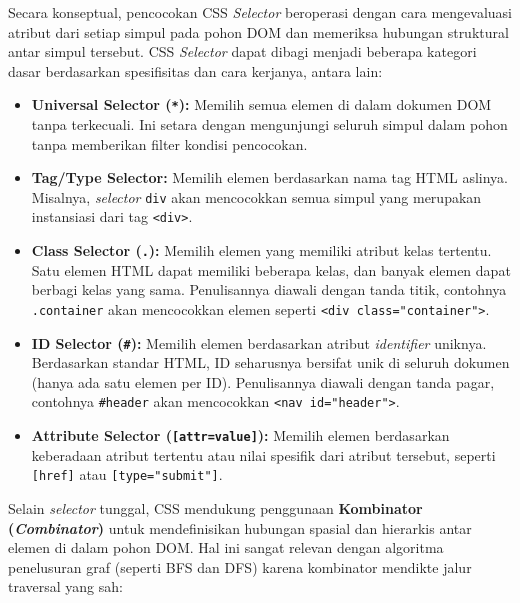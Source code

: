 \documentclass[12pt]{article}
\begin{document}
Secara konseptual, pencocokan CSS \textit{Selector} beroperasi dengan cara mengevaluasi atribut dari setiap simpul pada pohon DOM dan memeriksa hubungan struktural antar simpul tersebut. CSS \textit{Selector} dapat dibagi menjadi beberapa kategori dasar berdasarkan spesifisitas dan cara kerjanya, antara lain:

\begin{itemize}
    \item \textbf{Universal Selector (\verb|*|):} Memilih semua elemen di dalam dokumen DOM tanpa terkecuali. Ini setara dengan mengunjungi seluruh simpul dalam pohon tanpa memberikan filter kondisi pencocokan.
    
    \item \textbf{Tag/Type Selector:} Memilih elemen berdasarkan nama tag HTML aslinya. Misalnya, \textit{selector} \verb|div| akan mencocokkan semua simpul yang merupakan instansiasi dari tag \verb|<div>|.
    
    \item \textbf{Class Selector (\verb|.|):} Memilih elemen yang memiliki atribut kelas tertentu. Satu elemen HTML dapat memiliki beberapa kelas, dan banyak elemen dapat berbagi kelas yang sama. Penulisannya diawali dengan tanda titik, contohnya \verb|.container| akan mencocokkan elemen seperti \verb|<div class="container">|.
    
    \item \textbf{ID Selector (\verb|#|):} Memilih elemen berdasarkan atribut \textit{identifier} uniknya. Berdasarkan standar HTML, ID seharusnya bersifat unik di seluruh dokumen (hanya ada satu elemen per ID). Penulisannya diawali dengan tanda pagar, contohnya \verb|#header| akan mencocokkan \verb|<nav id="header">|.
    
    \item \textbf{Attribute Selector (\verb|[attr=value]|):} Memilih elemen berdasarkan keberadaan atribut tertentu atau nilai spesifik dari atribut tersebut, seperti \verb|[href]| atau \verb|[type="submit"]|.
\end{itemize}

Selain \textit{selector} tunggal, CSS mendukung penggunaan \textbf{Kombinator (\textit{Combinator})} untuk mendefinisikan hubungan spasial dan hierarkis antar elemen di dalam pohon DOM. Hal ini sangat relevan dengan algoritma penelusuran graf (seperti BFS dan DFS) karena kombinator mendikte jalur traversal yang sah:
\end{document}
